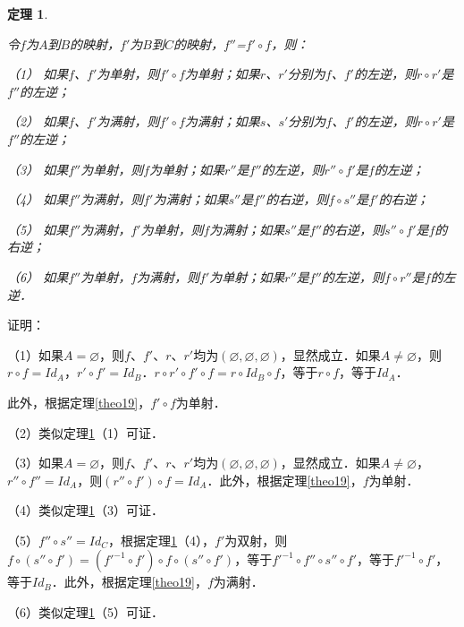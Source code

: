\documentclass[12pt, a4paper, oneside]{book}
\newtheorem{theo}{定理}
\begin{document}
			\begin{theo}\label{theo21}
				\hfill\par
				令$f$为$A$到$B$的映射，$f'$为$B$到$C$的映射，$f''$=$f'\circ f$，则：
				\par
				（1）	如果$f$、$f'$为单射，则$f'\circ f$为单射；如果$r$、$r'$分别为$f$、$f'$的左逆，则$r\circ r'$是$f''$的左逆；
				\par
				（2）	如果$f$、$f'$为满射，则$f'\circ f$为满射；如果$s$、$s'$分别为$f$、$f'$的左逆，则$r\circ r'$是$f''$的左逆；
				\par
				（3）	如果$f''$为单射，则$f$为单射；如果$r''$是$f''$的左逆，则$r''\circ f'$是$f$的左逆；
				\par
				（4）	如果$f''$为满射，则$f'$为满射；如果$s''$是$f''$的右逆，则$f\circ s''$是$f'$的右逆；
				\par
				（5）	如果$f''$为满射，$f'$为单射，则$f$为满射；如果$s''$是$f''$的右逆，则$s''\circ f'$是$f$的右逆；
				\par
				（6）	如果$f''$为单射，$f$为满射，则$f'$为单射；如果$r''$是$f''$的左逆，则$f\circ r''$是$f$的左逆．
			\end{theo}
			证明：
			\par
			（1）如果$A=\varnothing$，则$f$、$f'$、$r$、$r'$均为$(\varnothing, \varnothing, \varnothing)$，显然成立．如果$A\neq \varnothing$，则$r\circ f=Id_A$，$r'\circ f'=Id_B$．$r\circ r'\circ f'\circ f=r\circ Id_B\circ f$，等于$r\circ f$，等于$Id_A$．
			\par
			此外，根据定理\ref{theo19}，$f'\circ f$为单射．
			\par
			（2）类似定理\ref{theo21}（1）可证．
			\par
			（3）如果$A=\varnothing$，则$f$、$f'$、$r$、$r'$均为$(\varnothing, \varnothing, \varnothing)$，显然成立．如果$A\neq \varnothing$，$r''\circ f''=Id_A$，则$(r''\circ f') \circ f=Id_A$．此外，根据定理\ref{theo19}，$f$为单射．
			\par
			（4）类似定理\ref{theo21}（3）可证．
			\par
			（5）$f''\circ s''=Id_C$，根据定理\ref{theo21}（4），$f'$为双射，则$f\circ (s''\circ f')=({f'}^{-1}\circ f')\circ f\circ (s''\circ f')$，等于${f'}^{-1}\circ f'' \circ s''\circ f'$，等于${f'}^{-1}\circ f'$，等于$Id_B$．此外，根据定理\ref{theo19}，$f$为满射．
			\par
			（6）类似定理\ref{theo21}（5）可证．
\end{document}
